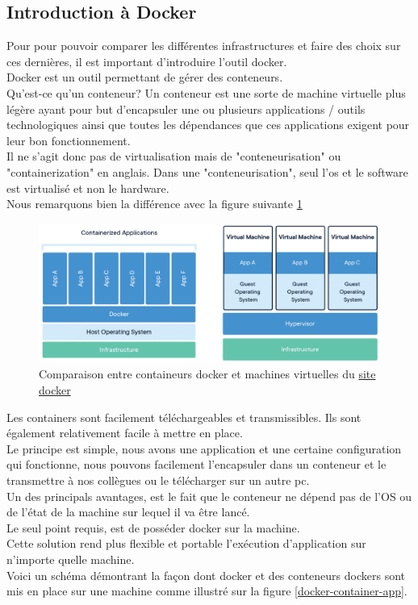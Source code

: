 \documentclass[
    iai, %
    il, %
]{heig-tb}
\begin{document}
\subsection{Introduction à Docker}
Pour pour pouvoir comparer les différentes infrastructures et faire des choix sur ces dernières, il est important d'introduire l'outil \Gls{docker}.\\
Docker est un outil permettant de gérer des conteneurs.\\
Qu'est-ce qu'un conteneur? Un \Gls{conteneur} est une sorte de machine virtuelle plus légère ayant pour but d'encapsuler une ou plusieurs applications / outils technologiques ainsi que toutes les dépendances que ces applications exigent pour leur bon fonctionnement.\\
Il ne s'agit donc pas de virtualisation mais de "conteneurisation" ou "containerization" en anglais.
Dans une "conteneurisation", seul l'\Gls{os} et le software est virtualisé et non le hardware.\\
Nous remarquons bien la différence avec la figure suivante \ref{docker-compare}

\begin{center}
    \begin{figure}
        \includegraphics[width=\textwidth]{./assets/figures/docker-containerized-and-vm.png}
        \caption[Comparaison Docker vs VM]{Comparaison entre containeurs docker et machines virtuelles
            du \href{https://www.docker.com/wp-content/uploads/2021/11/}{site docker}
            \label{docker-compare}}
    \end{figure}
\end{center}

Les containers sont facilement téléchargeables et transmissibles. Ils sont également relativement facile à mettre en place.\\
Le principe est simple, nous avons une application et une certaine configuration qui fonctionne, nous pouvons facilement l'encapsuler dans un conteneur et le transmettre à nos collègues ou le télécharger sur un autre pc.\\
Un des principals avantages, est le fait que le conteneur ne dépend pas de l'OS ou de l'état de la machine sur lequel il va être lancé.\\
Le seul point requis, est de posséder docker sur la machine.\\
Cette solution rend plus flexible et portable l'exécution d'application sur n'importe quelle machine.\\
Voici un schéma démontrant la façon dont docker et des conteneurs dockers sont mis en place sur une
machine comme illustré sur la figure \ref{docker-container-app}.
\end{document}
